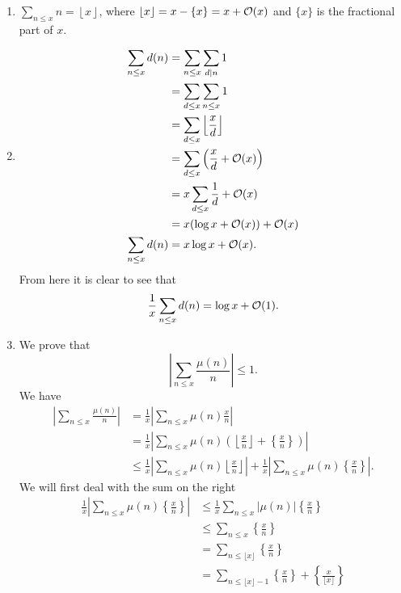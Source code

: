\documentclass[twoside, openright, fontsize=10pt, headings=big]{scrbook}
\begin{document}
\begin{example}{}{}
    \begin{enumerate}
        \item $\sum_{n\leq x}n=\left\lfloor x\right\rfloor$, where $\left\lfloor x\right\rfloor=x-\{x\}=x+\mathcal{O}(x)$ and $\{x\}$ is the fractional part of $x$.
        \item 
        \begin{align*}
            \sum_{n\leq x}d(n)&=\sum_{n\leq x}\sum_{d\mid n}1\\
            &=\sum_{d\leq x}\sum_{n\leq x}1\\
            &=\sum_{d\leq x}\left\lfloor\frac{x}{d}\right\rfloor\\
            &=\sum_{d\leq x}\left(\frac{x}{d}+\mathcal{O}(x)\right)\\
            &=x\sum_{d\leq x}\frac{1}{d}+\mathcal{O}(x)\\
            &=x(\log x +\mathcal{O}(x))+\mathcal{O}(x)\\
            \sum_{n\leq x}d(n)&=x\log x +\mathcal{O}(x).
        \end{align*}
        From here it is clear to see that
        \[
            \frac{1}{x}\sum_{n\leq x}d(n)=\log x + \mathcal{O}(1).
        \]
        \item We prove that
        \[
            \left|\sum_{n\leq x}\frac{\mu(n)}{n}\right|\leq 1.
        \]
        We have
        \begin{align*}
            \left|\sum_{n\leq x}\frac{\mu(n)}{n}\right|&=\frac{1}{x}\left|\sum_{n\leq x}\mu(n)\frac{x}{n}\right|\\
            &=\frac{1}{x}\left|\sum_{n\leq x}\mu(n)\left(\left\lfloor \frac{x}{n}\right\rfloor + \left\{\frac{x}{n}\right\}\right)\right|\\
            &\leq\frac{1}{x}\left|\sum_{n\leq x}\mu(n)\left\lfloor \frac{x}{n}\right\rfloor\right| + \frac{1}{x}\left|\sum_{n\leq x}\mu(n)\left\{ \frac{x}{n}\right\}\right|.
        \end{align*}
        We will first deal with the sum on the right
        \begin{align*}
            \frac{1}{x}\left|\sum_{n\leq x}\mu(n)\left\{ \frac{x}{n}\right\}\right|&\leq\frac{1}{x}\sum_{n\leq x}\left|\mu(n)\right|\left\{ \frac{x}{n}\right\}\\
            &\leq\sum_{n\leq x}\left\{\frac{x}{n}\right\}\\
            &=\sum_{n\leq \lfloor x\rfloor}\left\{\frac{x}{n}\right\}\\
            &=\sum_{n\leq \lfloor x\rfloor -1}\left\{\frac{x}{n} \right\}+\left\{\frac{x}{\lfloor x\rfloor} \right\}\\

\end{align*}
\end{enumerate}
\end{example}
\end{document}
